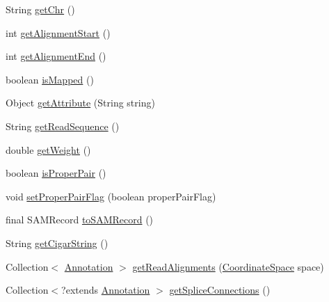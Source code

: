 \begin{DoxyCompactItemize}
\item 
String \hyperlink{classumms_1_1core_1_1alignment_1_1_single_end_alignment_a52638f714aa84c73b0ef79e02bd9390b}{get\+Chr} ()
\item 
int \hyperlink{classumms_1_1core_1_1alignment_1_1_single_end_alignment_a9f7d7609476d41c9cff235e581fa4ef1}{get\+Alignment\+Start} ()
\item 
int \hyperlink{classumms_1_1core_1_1alignment_1_1_single_end_alignment_a1128bfdff4a5057310ea9470da3b7b56}{get\+Alignment\+End} ()
\item 
boolean \hyperlink{classumms_1_1core_1_1alignment_1_1_single_end_alignment_a7f83aba9bd2a412269f8a9c99b98e260}{is\+Mapped} ()
\item 
Object \hyperlink{classumms_1_1core_1_1alignment_1_1_single_end_alignment_a0b0ebd5fb452d61925959b90e7f55932}{get\+Attribute} (String string)
\item 
String \hyperlink{classumms_1_1core_1_1alignment_1_1_single_end_alignment_ad2498b099878ec8d8599a7e0cddc16c8}{get\+Read\+Sequence} ()
\item 
double \hyperlink{classumms_1_1core_1_1alignment_1_1_single_end_alignment_a2deb3e94dfddeef2103d245c47686ee1}{get\+Weight} ()
\item 
boolean \hyperlink{classumms_1_1core_1_1alignment_1_1_single_end_alignment_a244a56ea5a881e4067a3d193f727d28f}{is\+Proper\+Pair} ()
\item 
void \hyperlink{classumms_1_1core_1_1alignment_1_1_single_end_alignment_a3d3da0d6884e3aa32e7e80f983e16a6d}{set\+Proper\+Pair\+Flag} (boolean proper\+Pair\+Flag)
\item 
final S\+A\+M\+Record \hyperlink{classumms_1_1core_1_1alignment_1_1_single_end_alignment_a8900401c84dd9a5afc250e8e841c40ff}{to\+S\+A\+M\+Record} ()
\item 
String \hyperlink{classumms_1_1core_1_1alignment_1_1_single_end_alignment_a9fd8f352f4558d8bab1da3ec428479ed}{get\+Cigar\+String} ()
\item 
Collection$<$ \hyperlink{interfaceumms_1_1core_1_1annotation_1_1_annotation}{Annotation} $>$ \hyperlink{classumms_1_1core_1_1alignment_1_1_single_end_alignment_add75d5f74290c291d87c7179aea0eaa7}{get\+Read\+Alignments} (\hyperlink{interfaceumms_1_1core_1_1coordinatesystem_1_1_coordinate_space}{Coordinate\+Space} space)
\item 
Collection$<$?extends \hyperlink{interfaceumms_1_1core_1_1annotation_1_1_annotation}{Annotation} $>$ \hyperlink{classumms_1_1core_1_1alignment_1_1_single_end_alignment_af9a4e3fc1eceb88258782e785dcc3d92}{get\+Splice\+Connections} ()

\end{DoxyCompactItemize}
